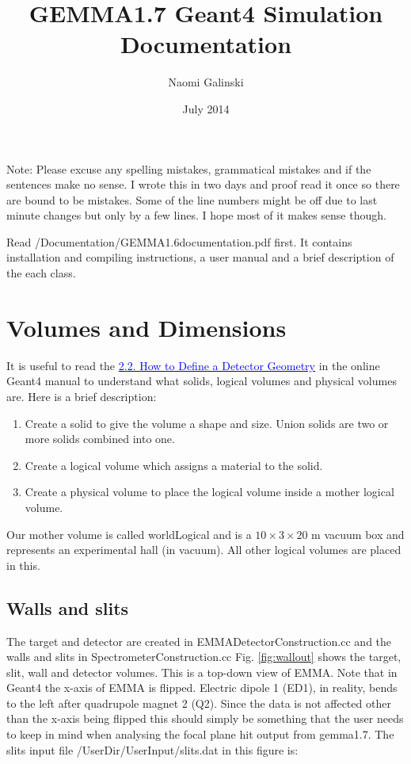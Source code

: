 \documentclass[letter,11pt]{article}
\title{GEMMA1.7 Geant4 Simulation Documentation}
\author{Naomi Galinski}
\date{July 2014}
\newcommand{\filefont}[1]{{\scriptsize\ttfamily\selectfont #1}\xspace}
\begin{document}
\onehalfspacing
\sloppy

\maketitle

\tableofcontents

\newpage

Note: Please excuse any spelling mistakes, grammatical mistakes and if the sentences make no sense. I wrote this in two days and proof read it once so there are bound to be mistakes. Some of the line numbers might be off due to last minute changes but only by a few lines. I hope most of it makes sense though.

Read /Documentation/GEMMA1.6documentation.pdf first. It contains installation and compiling instructions, a user manual and a brief description of the each class.

\section{Volumes and Dimensions}

It is useful to read the \href{http://geant4.web.cern.ch/geant4/UserDocumentation/UsersGuides/ForApplicationDeveloper/html/ch02s02.html}{\textcolor{blue}{2.2.  How to Define a Detector Geometry}} in the online Geant4 manual to understand what solids, logical volumes and physical volumes are. Here is a brief description:
\begin{enumerate}
\item Create a solid to give the volume a shape and size. Union solids are two or more solids combined into one.
\item Create a logical volume which assigns a material to the solid.
\item Create a physical volume to place the logical volume inside a mother logical volume.
\end{enumerate}

Our mother volume is called \filefont{worldLogical} and is a $10\times3\times20$ m vacuum box and represents an experimental hall (in vacuum). All other logical volumes are placed in this. 

\subsection{Walls and slits}

The target and detector are created in EMMADetectorConstruction.cc and the walls and slits in SpectrometerConstruction.cc Fig. \ref{fig:wallout} shows the target, slit, wall and detector volumes. This is a top-down view of EMMA. Note that in Geant4 the x-axis of EMMA is flipped. Electric dipole 1 (ED1), in reality, bends to the left after quadrupole magnet 2 (Q2). Since the data is not affected other than the x-axis being flipped this should simply be something that the user needs to keep in mind when analysing the focal plane hit output from gemma1.7. The slits input file /UserDir/UserInput/slits.dat in this figure is:
{\footnotesize }
\end{document}
